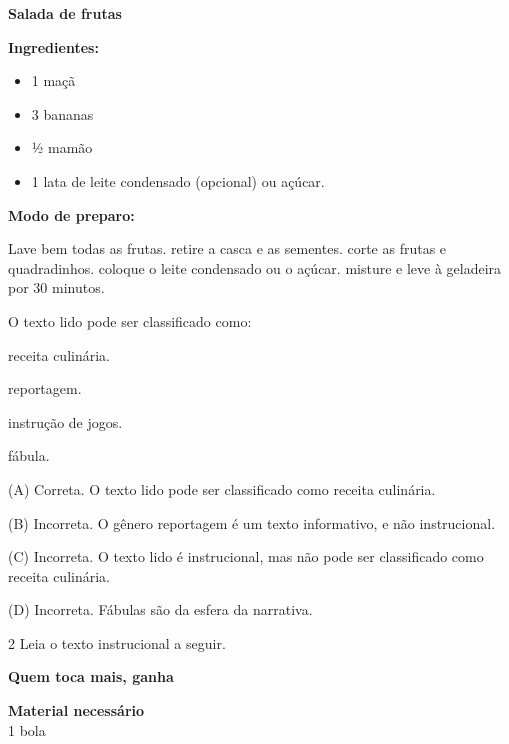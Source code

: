 \begin{escolha}
\begin{escolha}
\textbf{Salada de frutas}

\textbf{Ingredientes:}

\begin{itemize}
\item 1 maçã

\item 3 bananas

\item ½ mamão

\item 1 lata de leite condensado (opcional) ou açúcar.
\end{itemize}

\textbf{Modo de preparo:}

Lave bem todas as frutas. retire a casca e as sementes. corte as frutas
e quadradinhos. coloque o leite condensado ou o açúcar. misture e leve à
geladeira por 30 minutos.

O texto lido pode ser classificado como:

\begin{escolha}
\item
  receita culinária.
\item
  reportagem.
\item
  instrução de jogos.
\item
  fábula.
\end{escolha}



(A) Correta. O texto lido pode ser classificado como receita culinária.

(B) Incorreta. O gênero reportagem é um texto informativo, e não
instrucional.

(C) Incorreta. O texto lido é instrucional, mas não pode ser
classificado como receita culinária.

(D) Incorreta. Fábulas são da esfera da narrativa.


\num{2} Leia o texto instrucional a seguir.


\textbf{Quem toca mais, ganha}

\textbf{Material necessário}\\
1 bola


\end{escolha}
\end{escolha}
